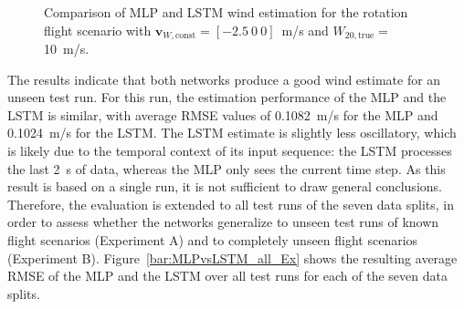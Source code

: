 \begin{figure}[htb]
%
	\caption{Comparison of MLP and LSTM wind estimation for the rotation flight scenario with $\bm{v}_{W,\mathrm{const}} = [-2.5\ 0\ 0]$\SI{}{m/s} and $W_{20, \mathrm{true}} = $ \SI{10}{m/s}.	}
	\label{fig:MLPvsLSTM_Ex}
\end{figure}

The results indicate that both networks produce a good wind estimate for an unseen test run. For this run, the estimation performance of the MLP and the LSTM is similar, with average RMSE values of \SI{0.1082}{m/s} for the MLP and \SI{0.1024}{m/s} for the LSTM. The LSTM estimate is slightly less oscillatory, which is likely due to the temporal context of its input sequence: the LSTM processes the last \SI{2}{s} of data, whereas the MLP only sees the current time step. As this result is based on a single run, it is not sufficient to draw general conclusions. Therefore, the evaluation is extended to all test runs of the seven data splits, in order to assess whether the networks generalize to unseen test runs of known flight scenarios (Experiment A) and to completely unseen flight scenarios (Experiment B). Figure~\ref{bar:MLPvsLSTM_all_Ex} shows the resulting average RMSE of the MLP and the LSTM over all test runs for each of the seven data splits.

